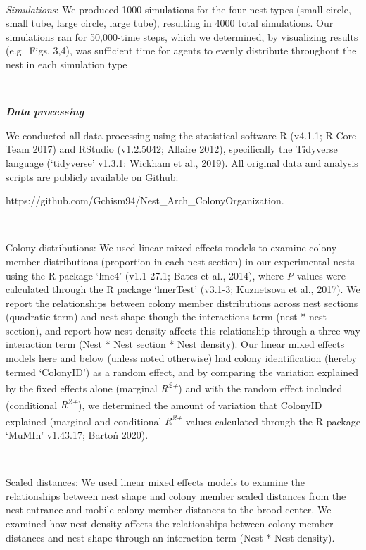 \documentclass[3p]{elsarticle} %
\begin{document}
~

\emph{Simulations}: We produced 1000 simulations for the four nest types
(small circle, small tube, large circle, large tube), resulting in 4000
total simulations. Our simulations ran for 50,000-time steps, which we
determined, by visualizing results (e.g.~Figs. 3,4), was sufficient time
for agents to evenly distribute throughout the nest in each simulation
type

~

\textbf{\emph{Data processing}}

We conducted all data processing using the statistical software R
(v4.1.1; R Core Team 2017) and RStudio (v1.2.5042; Allaire 2012),
specifically the Tidyverse language (`tidyverse' v1.3.1: Wickham et al.,
2019). All original data and analysis scripts are publicly available on
Github:

https://github.com/Gchism94/Nest\_Arch\_ColonyOrganization.

~

Colony distributions: We used linear mixed effects models to examine
colony member distributions (proportion in each nest section) in our
experimental nests using the R package `lme4' (v1.1-27.1; Bates et al.,
2014), where \emph{P} values were calculated through the R package
`lmerTest' (v3.1-3; Kuznetsova et al., 2017). We report the
relationships between colony member distributions across nest sections
(quadratic term) and nest shape though the interactions term (nest *
nest section), and report how nest density affects this relationship
through a three-way interaction term (Nest * Nest section * Nest
density). Our linear mixed effects models here and below (unless noted
otherwise) had colony identification (hereby termed `ColonyID') as a
random effect, and by comparing the variation explained by the fixed
effects alone (marginal \emph{R\textsuperscript{2+}}) and with the
random effect included (conditional \emph{R\textsuperscript{2+}}), we
determined the amount of variation that ColonyID explained (marginal and
conditional \emph{R\textsuperscript{2+}} values calculated through the R
package `MuMIn' v1.43.17; Bartoń 2020).

~

Scaled distances: We used linear mixed effects models to examine the
relationships between nest shape and colony member scaled distances from
the nest entrance and mobile colony member distances to the brood
center. We examined how nest density affects the relationships between
colony member distances and nest shape through an interaction term (Nest
* Nest density).
\end{document}
